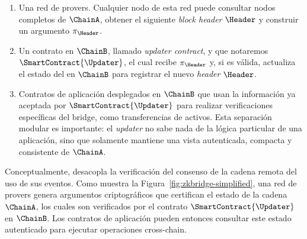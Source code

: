 \begin{enumerate}[noitemsep]
		\item Una red de provers. Cualquier nodo de esta red puede consultar nodos completos de $\ChainA$, obtener el siguiente \textit{block header} $\Header$ y construir un argumento \ZK $\pi_{\Header}$.
		\item Un contrato \Onchain en $\ChainB$, llamado \emph{updater contract}, y que notaremos $\SmartContract{\Updater}$, el cual recibe $\pi_{\Header}$ y, si es válida, actualiza el estado del \LightClient en $\ChainB$ para registrar el nuevo \textit{header} $\Header$.
		\item Contratos de aplicación desplegados en $\ChainB$ que usan la información ya aceptada por $\SmartContract{\Updater}$ para realizar verificaciones específicas del bridge, como transferencias de activos. Esta separación modular es importante: el \textit{updater} no sabe nada de la lógica particular de una aplicación, sino que solamente mantiene una vista autenticada, compacta y consistente de $\ChainA$.
\end{enumerate}

Conceptualmente, \zkBridge desacopla la verificación del consenso de la cadena remota del uso de sus eventos. Como muestra la Figura~\ref{fig:zkbridge-simplified}, una red de provers genera argumentos criptográficos que certifican el estado de la cadena  $\ChainA$, los cuales son verificados por el contrato $\SmartContract{\Updater}$ en $\ChainB$. Los contratos de aplicación pueden entonces consultar este estado autenticado para ejecutar operaciones cross-chain.

